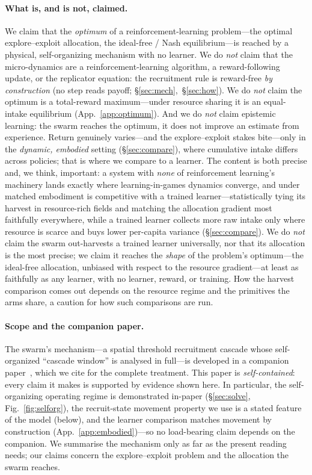 \documentclass{article}
\begin{document}
\paragraph{What is, and is not, claimed.} We claim that the \emph{optimum} of a reinforcement-learning
problem---the optimal explore--exploit allocation, the ideal-free / Nash equilibrium---is reached by a physical,
self-organizing mechanism with no learner. We do \emph{not} claim that the micro-dynamics are a
reinforcement-learning algorithm, a reward-following update, or the replicator equation: the recruitment rule
is reward-free \emph{by construction} (no step reads payoff; \S\ref{sec:mech},~\S\ref{sec:how}). We do
\emph{not} claim the optimum is a total-reward maximum---under resource sharing it is an equal-intake
equilibrium (App.~\ref{app:optimum}). And we do \emph{not} claim epistemic learning: the swarm reaches the
optimum, it does not improve an estimate from experience. Return genuinely varies---and the explore--exploit
stakes bite---only in the \emph{dynamic, embodied} setting (\S\ref{sec:compare}), where cumulative intake
differs across policies; that is where we compare to a learner. The content is both precise and, we think,
important: a system with \emph{none} of reinforcement learning's machinery lands exactly where
learning-in-games dynamics converge, and under matched embodiment is competitive with a trained learner---statistically
tying its harvest in resource-rich fields and matching the allocation gradient most faithfully everywhere, while
a trained learner collects more raw intake only where resource is scarce and buys lower per-capita variance
(\S\ref{sec:compare}). We do \emph{not} claim the swarm out-harvests a trained learner universally, nor that its
allocation is the most precise; we claim it reaches the \emph{shape} of the problem's optimum---the ideal-free
allocation, unbiased with respect to the resource gradient---at least as faithfully as any learner, with no
learner, reward, or training. How the harvest comparison comes out
depends on the resource regime and the primitives the arms share, a caution for how such comparisons are run.

\paragraph{Scope and the companion paper.} The swarm's mechanism---a spatial threshold recruitment cascade
whose self-organized ``cascade window'' is analysed in full---is developed in a companion
paper~\citep{partI}, which we cite for the complete treatment. This paper is \emph{self-contained}: every
claim it makes is supported by evidence shown here. In particular, the self-organizing operating regime is
demonstrated in-paper (\S\ref{sec:solve}, Fig.~\ref{fig:selforg}), the recruit-state movement property we use
is a stated feature of the model (below), and the learner comparison matches movement by construction
(App.~\ref{app:embodied})---so no load-bearing claim depends on the companion. We summarise the mechanism only
as far as the present reading needs; our claims concern the explore--exploit problem and the allocation the
swarm reaches.
\end{document}
